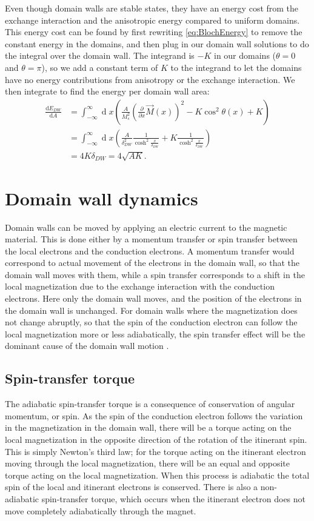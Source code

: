 \documentclass[12pt, a4paper]{article}		%
\renewcommand{\d}[1]{\ensuremath{\operatorname{d}\!{#1}}}
\numberwithin{equation}{section}
\begin{document}
Even though domain walls are stable states, they have an energy cost from the exchange interaction and the anisotropic energy compared to uniform domains. This energy cost can be found by first rewriting \eqref{eq:BlochEnergy} to remove the constant energy in the domains, and then plug in our domain wall solutions to do the integral over the domain wall. The integrand is $-K$ in our domains ($\theta = 0$ and $\theta = \pi$), so we add a constant term of $K$ to the integrand to let the domains have no energy contributions from anisotropy or the exchange interaction. We then integrate to find the energy per domain wall area:
\begin{align}
\nonumber\frac{\textrm{d} E_{DW}}{\textrm{d} A} &= \int_{-\infty}^{\infty} \d x (\frac{A}{M_s^2}(\frac{\partial}{\partial x}\vec{M}(x))^2 - K \cos ^2 \theta (x) + K) \\
\nonumber&= \int_{-\infty}^{\infty} \d x (\frac{A}{\delta_{DW}^2}\frac{1}{\cosh^2\frac{x}{\delta_{DW}}} + K \frac{1}{\cosh^2\frac{x}{\delta_{DW}}}) \\
&= 4K\delta_{DW} = 4\sqrt{AK}.
\end{align}

\section{Domain wall dynamics}
Domain walls can be moved by applying an electric current to the magnetic material. This is done either by a momentum transfer or spin transfer between the local electrons and the conduction electrons. A momentum transfer would correspond to actual movement of the electrons in the domain wall, so that the domain wall moves with them, while a spin transfer corresponds to a shift in the local magnetization due to the exchange interaction with the conduction electrons. Here only the domain wall moves, and the position of the electrons in the domain wall is unchanged. For domain walls where the magnetization does not change abruptly, so that the spin of the conduction electron can follow the local magnetization more or less adiabatically, the spin transfer effect will be the dominant cause of the domain wall motion \cite{KohnoTatara-04}. 

\subsection{Spin-transfer torque}
The adiabatic spin-transfer torque is a consequence of conservation of angular momentum, or spin. As the spin of the conduction electron follows the variation in the magnetization in the domain wall, there will be a torque acting on the local magnetization in the opposite direction of the rotation of the itinerant spin. This is simply Newton's third law; for the torque acting on the itinerant electron moving through the local magnetization, there will be an equal and opposite torque acting on the local magnetization. When this process is adiabatic the total spin of the local and itinerant electrons is conserved. There is also a non-adiabatic spin-transfer torque, which occurs when the itinerant electron does not move completely adiabatically through the magnet. 
\end{document}
